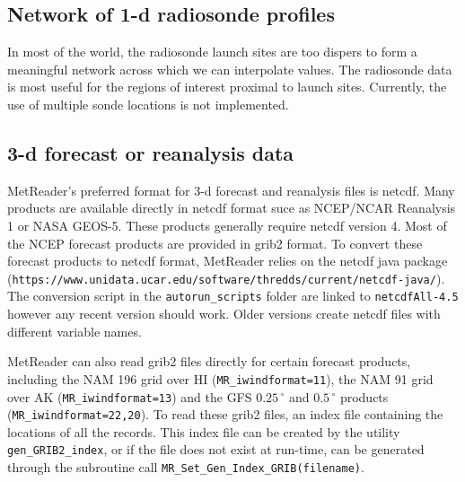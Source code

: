 \documentclass[11pt]{article}   %
\begin{document}
\subsection{Network of 1-d radiosonde profiles}
In most of the world, the radiosonde launch sites are too dispers to form
a meaningful network across which we can interpolate values.  The radiosonde
data is most useful for the regions of interest proximal to launch sites.
Currently, the use of multiple sonde locations is not implemented.

\subsection{3-d forecast or reanalysis data}
MetReader's preferred format for 3-d forecast and reanalysis files is netcdf.  Many
products are available directly in netcdf format suce as NCEP/NCAR Reanalysis 1 or
NASA GEOS-5.  These products generally require netcdf version 4.  Most of the NCEP
forecast products are provided in grib2 format.  To convert these forecast products
to netcdf format, MetReader relies on the netcdf java package
(\texttt{https://www.unidata.ucar.edu/software/thredds/current/netcdf-java/}).  The
conversion script in the \texttt{autorun\_scripts} folder are linked to \texttt{netcdfAll-4.5}
however any recent version should work.  Older versions create netcdf files with
different variable names.

MetReader can also read grib2 files directly for certain forecast products, including the
NAM 196 grid over HI (\texttt{MR\_iwindformat=11}), the NAM 91 grid over AK
(\texttt{MR\_iwindformat=13}) and the GFS $0.25 \, ^{\circ}$ and $0.5 \, ^{\circ}$
products (\texttt{MR\_iwindformat=22,20}).  To read these grib2 files, an index
file containing the locations of all the records.  This index file can be created 
by the utility \texttt{gen\_GRIB2\_index}, or if the file does not exist at
run-time, can be generated through the subroutine call
\texttt{MR\_Set\_Gen\_Index\_GRIB(filename)}.
\end{document}
